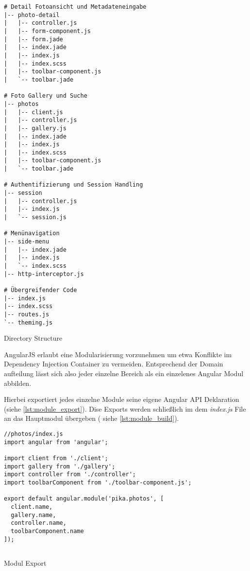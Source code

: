 \begin{listing}[H]
\begin{verbatim}
# Detail Fotoansicht und Metadateneingabe 
|-- photo-detail 
|   |-- controller.js
|   |-- form-component.js
|   |-- form.jade
|   |-- index.jade
|   |-- index.js
|   |-- index.scss
|   |-- toolbar-component.js
|   `-- toolbar.jade

# Foto Gallery und Suche
|-- photos
|   |-- client.js
|   |-- controller.js
|   |-- gallery.js
|   |-- index.jade
|   |-- index.js
|   |-- index.scss
|   |-- toolbar-component.js
|   `-- toolbar.jade

# Authentifizierung und Session Handling
|-- session
|   |-- controller.js
|   |-- index.js
|   `-- session.js

# Menünavigation
|-- side-menu
|   |-- index.jade
|   |-- index.js
|   `-- index.scss
|-- http-interceptor.js

# Übergreifender Code
|-- index.js
|-- index.scss
|-- routes.js
`-- theming.js
\end{verbatim}
\caption{Directory Structure}
\label{lst:directorty_structure}
\end{listing}

AngularJS erlaubt eine Modularisierung vorzunehmen um etwa Konflikte im Dependency Injection Container zu vermeiden. Entsprechend der Domain aufteilung lässt sich also jeder einzelne Bereich als ein einzelenes Angular Modul abbilden.

Hierbei exportiert jedes einzelne Module seine eigene Angular API Deklaration (siehe \ref{lst:module_export}). Dise Exports werden schließlich im dem \textit{index.js} File an das  Hauptmodul übergeben ( siehe \ref{lst:module_build}).


\begin{listing}[H]
\begin{verbatim}
//photos/index.js
import angular from 'angular';

import client from './client';
import gallery from './gallery';
import controller from './controller';
import toolbarComponent from './toolbar-component.js';

export default angular.module('pika.photos', [
  client.name,
  gallery.name,
  controller.name,
  toolbarComponent.name
]);
 
\end{verbatim}
\caption{Modul Export}
\label{lst:module_export}
\end{listing}


